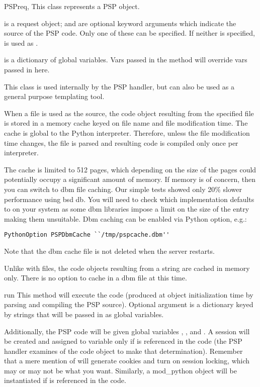 \begin{classdesc}{PSP}{req, }
  This class represents a PSP object.

   is a request object;  and  are
  optional keyword arguments which indicate the source of the PSP
  code. Only one of these can be specified. If neither is specified,
   is used as .

   is a dictionary of global variables. Vars passed in the
   method will override vars passed in here.

  This class is used internally by the PSP handler, but can also be
  used as a general purpose templating tool.

  When a file is used as the source, the code object resulting from
  the specified file is stored in a memory cache keyed on file name
  and file modification time. The cache is global to the Python
  interpreter. Therefore, unless the file modification time changes,
  the file is parsed and resulting code is compiled only once per
  interpreter.

  The cache is limited to 512 pages, which depending on the size of
  the pages could potentially occupy a significant amount of
  memory. If memory is of concern, then you can switch to dbm file
  caching. Our simple tests showed only 20\% slower performance using
  bsd db. You will need to check which implementation 
  defaults to on your system as some dbm libraries impose a limit on
  the size of the entry making them unsuitable. Dbm caching can be
  enabled via  Python option, e.g.:

\begin{verbatim}
PythonOption PSPDbmCache ``/tmp/pspcache.dbm''
\end{verbatim}
  Note that the dbm cache file is not deleted when the server
  restarts.

  Unlike with files, the code objects resulting from a string are
  cached in memory only. There is no option to cache in a dbm file at
  this time.

  \begin{methoddesc}[PSP]{run}{}
    This method will execute the code (produced at object
    initialization time by parsing and compiling the PSP
    source). Optional argument  is a dictionary keyed by
    strings that will be passed in as global variables.

    Additionally, the PSP code will be given global variables
    , ,  and . A session
    will be created and assigned to  variable only if
     is referenced in the code (the PSP handler examines
     of the code object to make that
    determination). Remember that a mere mention of 
    will generate cookies and turn on session locking, which may or
    may not be what you want. Similarly, a mod_python
     object will be instantiated if  is
    referenced in the code.


\end{methoddesc}
\end{classdesc}
